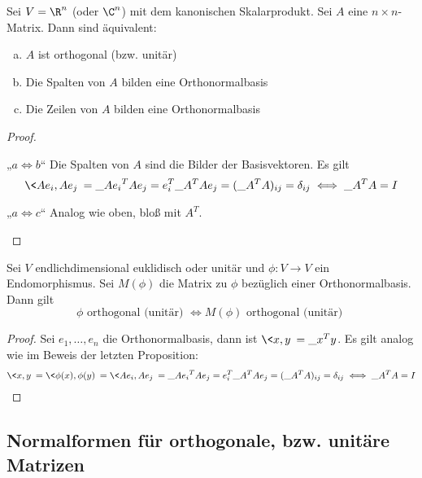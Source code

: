 \documentclass{mycourse}
\begin{document}
\begin{prop}
	\label{prop:13.18}
	Sei $V = \R^n$ (oder $\C^n$) mit dem kanonischen Skalarprodukt.
	Sei $A$ eine $n\times n$-Matrix.
	Dann sind äquivalent:
	\begin{enumerate}[(a)]
		\item
			$A$ ist orthogonal (bzw. unitär)
		\item
			Die Spalten von $A$ bilden eine Orthonormalbasis
		\item
			Die Zeilen von $A$ bilden eine Orthonormalbasis
	\end{enumerate}
	\begin{proof}~
		\begin{seg}{„$a \iff b$“}
			Die Spalten von $A$ sind die Bilder der Basisvektoren.
			Es gilt
			\[
				\<Ae_i,Ae_j\> = \_{Ae_i}^TAe_j = e_i^T\_A^TAe_j = (\_A^TA)_{ij} = \delta_{ij} \iff \_A^TA = I
			\]
		\end{seg}
		\begin{seg}{„$a \iff c$“}
			Analog wie oben, bloß mit $A^T$.
		\end{seg}
	\end{proof}
\end{prop}

\begin{prop}
	\label{prop:13.19}
	Sei $V$ endlichdimensional euklidisch oder unitär und $\phi:V\to V$ ein Endomorphismus.
	Sei $M(\phi)$ die Matrix zu $\phi$ bezüglich einer Orthonormalbasis.
	Dann gilt
	\[
		\phi \text{ orthogonal (unitär) } \iff M(\phi) \text{ orthogonal (unitär) }
	\]
	\begin{proof}
		Sei $e_1,\dotsc, e_n$ die Orthonormalbasis, dann ist $\<x,y\>=\_x^Ty$.
		Es gilt analog wie im Beweis der letzten Proposition:
		\begin{align*}
			\<x,y\> = \<\phi(x),\phi(y)\> = \<Ae_i,Ae_j\> = \_{Ae_i}^TAe_j = e_i^T\_A^TAe_j = (\_A^TA)_{ij} = \delta_{ij} \iff \_A^TA = I
		\end{align*}
	\end{proof}
\end{prop}

\subsection{Normalformen für orthogonale, bzw. unitäre Matrizen}
\end{document}
